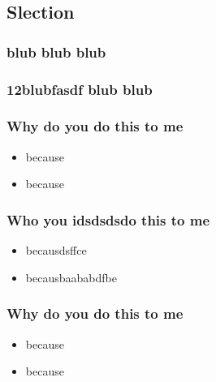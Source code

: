 \documentclass{beamer}
\begin{document}
        \subsection{Slection}
            \begin{frame}
                \frametitle{blub blub blub}
            \end{frame}
            \begin{frame}
                \frametitle{12blubfasdf blub blub}
            \end{frame}
        \begin{frame}
            \frametitle{Why do you do this to me}
            \begin{itemize}
                \item because
                \item because
            \end{itemize}
        \end{frame}
        \begin{frame}
            \frametitle{Who you idsdsdsdo this to me}
            \begin{itemize}
                \item becausdsffce
                \item becausbaababdfbe
            \end{itemize}
        \end{frame}
        \begin{frame}
            \frametitle{Why do you do this to me}
            \begin{itemize}
                \item because
                \item because
            \end{itemize}
        \end{frame}
\end{document}
